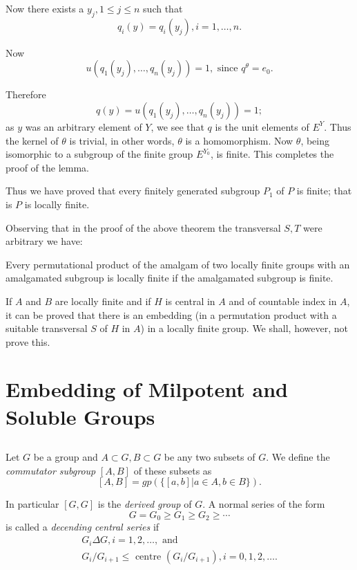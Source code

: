 Now there exists a $y_j,1\leq j \leq n$ such that
$$
q_i(y)=q_i(y_j),i=1, \ldots, n.
$$

Now 
$$
u(q_1(y_j),\ldots,q_n(y_j))=1, \text{ since } q^\theta =e_0.
$$

Therefore
$$
q(y)=u(q_1(y_j),\ldots,q_n(y_j))=1;
$$
as $y$ was an arbitrary element of $Y$, we see that $q$ is the unit
elements of $E^Y$. Thus the kernel of $\theta$ is trivial, in other
words, $\theta$ is a homomorphism. Now $\theta$, being isomorphic to a
subgroup of the finite group $E^{Y_0}$, is finite. This completes the
proof of the lemma. 

Thus we have proved that every finitely generated subgroup $P_1$ of
$P$ is finite; that is $P$ is locally finite. 

Observing that in the proof of the above theorem the transversal $S,T$
were arbitrary we have: 
\begin{corollary}
  Every permutational product of the amalgam of two locally finite
  groups with an amalgamated subgroup is locally finite if the
  amalgamated subgroup is finite. 
\end{corollary}

If $A$ and $B$ are locally finite and if $H$ is central in $A$ and of
countable index in $A$, it can be proved that there is an embedding
(in a permutation product with a suitable transversal $S$ of $H$ in
$A$) in a locally finite group. We shall, however, not prove this. 

\chapter{Embedding of Milpotent and Soluble Groups}

\section {}%

Let $G$ be a group and $A \subset G,B \subset G$ be any two subsets of
$G$. We define the \textit{ commutator subgroup} $[A,B]$ of these
subsets as 
$$
[A,B]=gp\left(\bigg \{ [a,b]\big | a \in A, b \in B \bigg \} \right).
$$

In particular $[G,G]$ is the \textit{derived group} of $G$. A normal
series of the form 
$$
G=G_0 \geq G_1 \geq G_2 \geq \cdots
$$
is called a \textit {decending central series} if 
\begin{gather*}
  G_i \Delta G, i=1,2, \ldots, \text{ and }\\
  G_i/G_{i+1} \leq \text{ centre } (G_i/ G_{i+1}), i=0,1,2, \ldots.
\end{gather*}

